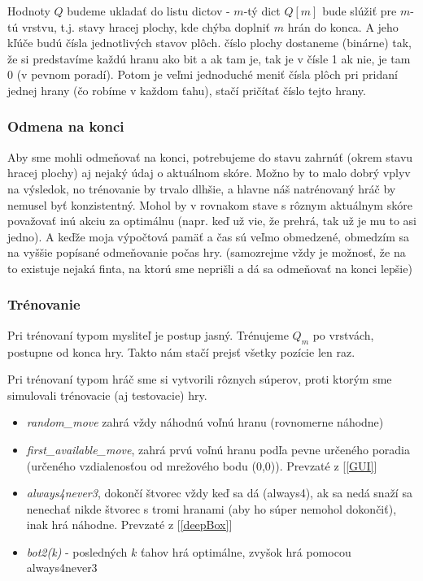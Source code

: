 \documentclass[10pt,a4paper]{article}
\begin{document}
Hodnoty $Q$ budeme ukladať do listu dictov - $m$-tý dict $Q[m]$ bude slúžiť pre $m$-tú vrstvu, t.j. stavy hracej plochy, kde chýba doplniť $m$ hrán do konca. A jeho kľúče budú čísla jednotlivých stavov plôch. číslo plochy dostaneme (binárne) tak, že si predstavíme každú hranu ako bit a ak tam je, tak je v čísle 1 ak nie, je tam 0 (v pevnom poradí). Potom je veľmi jednoduché meniť čísla plôch pri pridaní jednej hrany (čo robíme v každom ťahu), stačí pričítať číslo tejto hrany.


\subsubsection{Odmena na konci}

Aby sme mohli odmeňovať na konci, potrebujeme do stavu zahrnúť (okrem stavu hracej plochy) aj nejaký údaj o aktuálnom skóre. 
Možno by to malo dobrý vplyv na výsledok, no trénovanie by trvalo dlhšie, a hlavne náš natrénovaný hráč by nemusel byť konzistentný.
Mohol by v rovnakom stave s rôznym aktuálnym skóre považovať inú akciu za optimálnu (napr. keď už vie, že prehrá, tak už je mu to asi jedno).
A keďže moja výpočtová pamäť a čas sú veľmo obmedzené, obmedzím sa na vyššie popísané odmeňovanie počas hry.
(samozrejme vždy je možnosť, že na to existuje nejaká finta, na ktorú sme neprišli a dá sa odmeňovať na konci lepšie)


\subsubsection{Trénovanie}

Pri trénovaní typom mysliteľ je postup jasný. Trénujeme $Q_m$ po vrstvách, postupne od konca hry. 
Takto nám stačí prejsť všetky pozície len raz.

Pri trénovaní typom hráč sme si vytvorili rôznych súperov, proti ktorým sme simulovali trénovacie (aj testovacie) hry.

\begin{itemize}
\item \textit{random\_move} zahrá vždy náhodnú voľnú hranu (rovnomerne náhodne)
\item \textit{first\_available\_move}, zahrá prvú voľnú hranu podľa pevne určeného poradia (určeného vzdialenosťou od mrežového bodu (0,0)).
	Prevzaté z [\ref{GUI}]
\item \textit{always4never3}, dokončí štvorec vždy keď sa dá (always4), ak sa nedá snaží sa nenechať nikde štvorec s tromi hranami (aby ho súper nemohol dokončiť), inak hrá náhodne. Prevzaté z [\ref{deepBox}]
\item \textit{bot2(k)} - posledných $k$ ťahov hrá optimálne, zvyšok hrá pomocou always4never3
\end{itemize}
\end{document}
